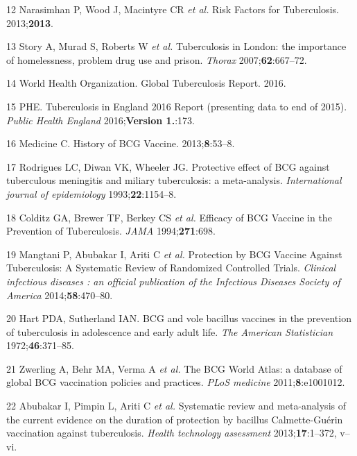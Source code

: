 \documentclass[11pt,twoside]{bristolthesis}
\begin{document}
  \leavevmode\hypertarget{ref-Narasimhan2013}{}%
  12 Narasimhan P, Wood J, Macintyre CR \emph{et al.} Risk Factors for Tuberculosis. 2013;\textbf{2013}.
  
  \leavevmode\hypertarget{ref-Story2007}{}%
  13 Story A, Murad S, Roberts W \emph{et al.} Tuberculosis in London: the importance of homelessness, problem drug use and prison. \emph{Thorax} 2007;\textbf{62}:667--72.
  
  \leavevmode\hypertarget{ref-WHOTB2016}{}%
  14 World Health Organization. Global Tuberculosis Report. 2016.
  
  \leavevmode\hypertarget{ref-PHE2016a}{}%
  15 PHE. Tuberculosis in England 2016 Report (presenting data to end of 2015). \emph{Public Health England} 2016;\textbf{Version 1.}:173.
  
  \leavevmode\hypertarget{ref-Medicine2013}{}%
  16 Medicine C. History of BCG Vaccine. 2013;\textbf{8}:53--8.
  
  \leavevmode\hypertarget{ref-Rodrigues1993}{}%
  17 Rodrigues LC, Diwan VK, Wheeler JG. Protective effect of BCG against tuberculous meningitis and miliary tuberculosis: a meta-analysis. \emph{International journal of epidemiology} 1993;\textbf{22}:1154--8.
  
  \leavevmode\hypertarget{ref-Colditz1994}{}%
  18 Colditz GA, Brewer TF, Berkey CS \emph{et al.} Efficacy of BCG Vaccine in the Prevention of Tuberculosis. \emph{JAMA} 1994;\textbf{271}:698.
  
  \leavevmode\hypertarget{ref-Mangtani2014a}{}%
  19 Mangtani P, Abubakar I, Ariti C \emph{et al.} Protection by BCG Vaccine Against Tuberculosis: A Systematic Review of Randomized Controlled Trials. \emph{Clinical infectious diseases : an official publication of the Infectious Diseases Society of America} 2014;\textbf{58}:470--80.
  
  \leavevmode\hypertarget{ref-Hart1972}{}%
  20 Hart PDA, Sutherland IAN. BCG and vole bacillus vaccines in the prevention of tuberculosis in adolescence and early adult life. \emph{The American Statistician} 1972;\textbf{46}:371--85.
  
  \leavevmode\hypertarget{ref-Zwerling2011}{}%
  21 Zwerling A, Behr MA, Verma A \emph{et al.} The BCG World Atlas: a database of global BCG vaccination policies and practices. \emph{PLoS medicine} 2011;\textbf{8}:e1001012.
  
  \leavevmode\hypertarget{ref-Abubakar2013}{}%
  22 Abubakar I, Pimpin L, Ariti C \emph{et al.} Systematic review and meta-analysis of the current evidence on the duration of protection by bacillus Calmette-Guérin vaccination against tuberculosis. \emph{Health technology assessment} 2013;\textbf{17}:1--372, v--vi.
  
\end{document}
